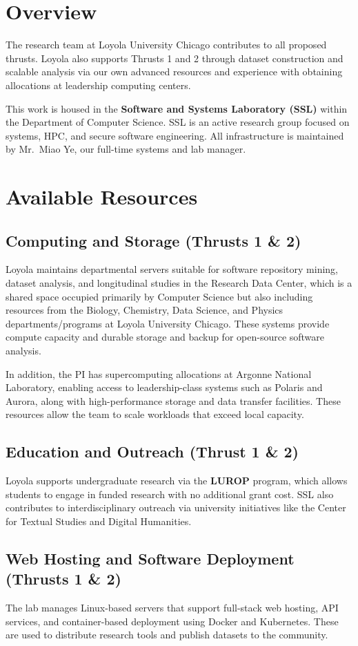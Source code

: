 \section{Overview}

The research team at Loyola University Chicago contributes to all proposed thrusts.
Loyola also supports Thrusts 1 and 2 through dataset construction and scalable analysis via our own advanced resources and experience with obtaining allocations at leadership computing centers.

This work is housed in the \textbf{Software and Systems Laboratory (SSL)} within the Department of Computer Science. SSL is an active research group focused on systems, HPC, and secure software engineering. All infrastructure is maintained by Mr.~Miao Ye, our full-time systems and lab manager.

\section{Available Resources}

\subsection{Computing and Storage (Thrusts 1 \& 2)}

Loyola maintains departmental servers suitable for software repository mining, dataset analysis, and longitudinal studies in the Research Data Center, which is a shared space occupied primarily by Computer Science but also including resources from the Biology, Chemistry, Data Science, and Physics departments/programs at Loyola University Chicago. These systems provide compute capacity and durable storage and backup for open-source software analysis.

In addition, the PI has supercomputing allocations at Argonne National Laboratory, enabling access to leadership-class systems such as Polaris and Aurora, along with high-performance storage and data transfer facilities.
These resources allow the team to scale workloads that exceed local capacity.

\subsection{Education and Outreach (Thrust 1 \& 2)}

Loyola supports undergraduate research via the \textbf{LUROP} program, which allows students to engage in funded research with no additional grant cost. SSL also contributes to interdisciplinary outreach via university initiatives like the Center for Textual Studies and Digital Humanities.

\subsection{Web Hosting and Software Deployment (Thrusts 1 \& 2)}

The lab manages Linux-based servers that support full-stack web hosting, API services, and container-based deployment using Docker and Kubernetes. These are used to distribute research tools and publish datasets to the community.

